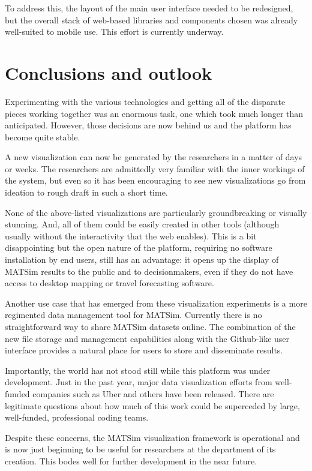 \documentclass[Afour,sageh,times]{sagej}
\begin{document}
To address this, the layout of the main user interface needed to be redesigned, but the overall stack of web-based libraries and components chosen was already well-suited to mobile use. This effort is currently underway.

\section{Conclusions and outlook}

Experimenting with the various technologies and getting all of the disparate pieces working together was an enormous task, one which took much longer than anticipated. However, those decisions are now behind us and the platform has become quite stable.

A new visualization can now be generated by the researchers in a matter of days or weeks. The researchers are admittedly very familiar with the inner workings of the system, but even so it has been encouraging to see new visualizations go from ideation to rough draft in such a short time.

None of the above-listed visualizations are particularly groundbreaking or visually stunning. And, all of them could be easily created in other tools (although usually without the interactivity that the web enables). This is a bit disappointing but the open nature of the platform, requiring no software installation by end users, still has an advantage: it opens up the display of MATSim results to the public and to decisionmakers, even if they do not have access to desktop mapping or travel forecasting software.

Another use case that has emerged from these visualization experiments is a more regimented data management tool for MATSim. Currently there is no straightforward way to share MATSim datasets online. The combination of the new file storage and management capabilities along with the Github-like user interface provides a natural place for users to store and disseminate results.

Importantly, the world has not stood still while this platform was under development. Just in the past year, major data visualization efforts from well-funded companies such as Uber and others have been released. There are legitimate questions about how much of this work could be superceded by large, well-funded, professional coding teams.

Despite these concerns, the MATSim visualization framework is operational and is now just beginning to be useful for researchers at the department of its creation. This bodes well for further development in the near future.
\end{document}
